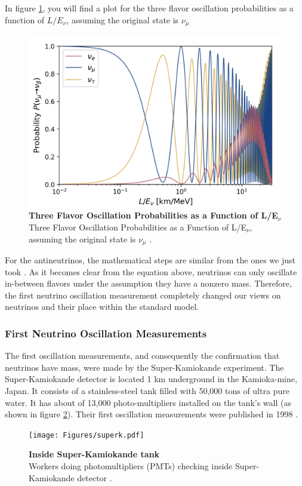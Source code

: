 In figure \ref{fig:nu_osc_prob}, you will find a plot for the three flavor oscillation probabilities as a function of $L/E_{\nu}$, assuming the original state is $\nu_{\mu}$

\begin{figure}[h!]
	\begin{center}
		\includegraphics[scale=0.2]{Figures/three_flavor_osc.jpg}
		\caption[Three Flavor Oscillation Model]{\textbf{Three Flavor Oscillation Probabilities as a Function of L/E$_{\nu}$} \\Three Flavor Oscillation Probabilities as a Function of L/E$_{\nu}$, assuming the original state is $\nu_{\mu}$ \cite{Lauren_thesis}.}
		\label{fig:nu_osc_prob}
	\end{center}
\end{figure}
%
For the antineutrinos, the mathematical steps are similar from the ones we just took \cite{oscillation_math}. 
%
As it becomes clear from the equation above, neutrinos can only oscillate in-between flavors under the assumption they have a nonzero mass. Therefore, the first neutrino oscillation measurement completely changed our views on neutrinos and their place within the standard model. 
%
\subsubsection{First Neutrino Oscillation Measurements}
The first oscillation measurements, and consequently the confirmation that neutrinos have mass, were made by the Super-Kamiokande experiment. The Super-Kamiokande detector is located 1 km underground in the Kamioka-mine, Japan. It consists of a stainless-steel tank filled with 50,000 tons of ultra pure water. It has about of 13,000 photo-multipliers installed on the tank's wall (as shown in figure \ref{superk_picture}). Their first oscillation measurements were published in 1998 \cite{first_kamioka_measure}.
%
\begin{figure}[h!]
	\begin{center}
		\texttt{[image: Figures/superk.pdf]}
		\caption[Inside Super-Kamiokande tank]{ {\textbf{Inside Super-Kamiokande tank}}\\Workers doing photomultipliers (PMTs) checking inside Super-Kamiokande detector \cite{superk_picture}.}
		\label{superk_picture}	
	\end{center}
\end{figure}
%

